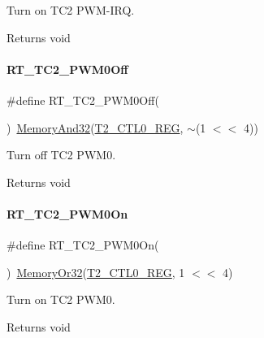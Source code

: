 Turn on T\+C2 P\+W\+M-\/\+I\+RQ. 

\begin{DoxyReturn}{Returns}
void 
\end{DoxyReturn}
\mbox{\label{a00083_a52f984fc9f5bc4d1821025ad8d75f3c9}} 
\paragraph{\texorpdfstring{R\+T\+\_\+\+T\+C2\+\_\+\+P\+W\+M0\+Off}{RT\_TC2\_PWM0Off}}
{\footnotesize\ttfamily \#define R\+T\+\_\+\+T\+C2\+\_\+\+P\+W\+M0\+Off(\begin{DoxyParamCaption}{ }\end{DoxyParamCaption})~\mbox{\hyperlink{a00026_ad87cedffcaadc51db22594fce55173d4}{Memory\+And32}}(\mbox{\hyperlink{a00026_a5853553391e986211306d4f29ab31e47}{T2\+\_\+\+C\+T\+L0\+\_\+\+R\+EG}}, $\sim$(1 $<$$<$ 4))}



Turn off T\+C2 P\+W\+M0. 

\begin{DoxyReturn}{Returns}
void 
\end{DoxyReturn}
\mbox{\label{a00083_abaff3048e72dc0cb912c898a0a4c4e14}} 
\paragraph{\texorpdfstring{R\+T\+\_\+\+T\+C2\+\_\+\+P\+W\+M0\+On}{RT\_TC2\_PWM0On}}
{\footnotesize\ttfamily \#define R\+T\+\_\+\+T\+C2\+\_\+\+P\+W\+M0\+On(\begin{DoxyParamCaption}{ }\end{DoxyParamCaption})~\mbox{\hyperlink{a00026_a27874a97deab7cecdde5ddecf466e31e}{Memory\+Or32}}(\mbox{\hyperlink{a00026_a5853553391e986211306d4f29ab31e47}{T2\+\_\+\+C\+T\+L0\+\_\+\+R\+EG}}, 1 $<$$<$ 4)}



Turn on T\+C2 P\+W\+M0. 

\begin{DoxyReturn}{Returns}
void 
\end{DoxyReturn}
\mbox{\label{a00083_adec1566e2c2a16ab922163a22f3c99df}} 
